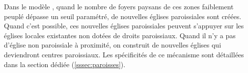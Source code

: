 \begin{itemize}
	\begin{tcolorbox}[breakable,left=0pt,right=0pt,top=0pt,bottom=0pt,
		colback=gray!15,colframe=gray!15,width=\dimexpr0.94\textwidth\relax, 
		enlarge left by=0mm, boxsep=5pt,arc=0pt,outer arc=0pt]
	Dans le modèle \simfeodal{}, quand le nombre de foyers paysans de ces zones faiblement peuplé dépasse un seuil paramétré, de nouvelles églises paroissiales sont créées.
	Quand c'est possible, ces nouvelles églises paroissiales peuvent s'appuyer sur les églises locales existantes non dotées de droits paroissiaux.
	Quand il n'y a pas d'église non paroissiale à proximité, on construit de nouvelles églises qui deviendront centres paroissiaux.
	Les spécificités de ce mécanisme sont détaillées dans la section dédiée (\cref{sssec:paroisses}).
\end{tcolorbox}
\end{itemize}



%

